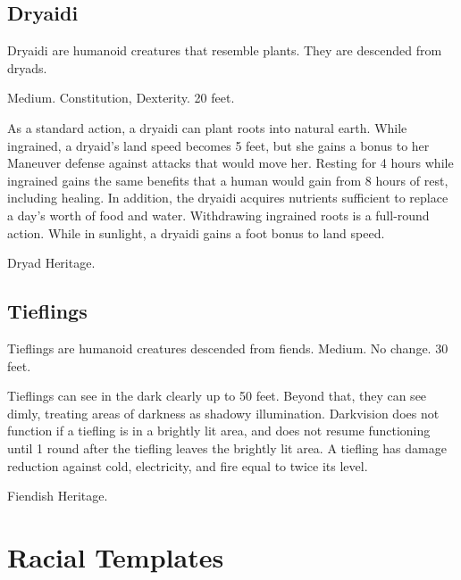     \subsection{Dryaidi}

        Dryaidi are humanoid creatures that resemble plants. They are descended from dryads.

         Medium.
          Constitution,  Dexterity.
         20 feet.
        \begin{itemize}
             As a standard action, a dryaidi can plant roots into natural earth. While ingrained, a dryaid's land speed becomes 5 feet, but she gains a  bonus to her Maneuver defense against attacks that would move her. Resting for 4 hours while ingrained gains the same benefits that a human would gain from 8 hours of rest, including healing. In addition, the dryaidi acquires nutrients sufficient to replace a day's worth of food and water. Withdrawing ingrained roots is a full-round action.
             While in sunlight, a dryaidi gains a  foot bonus to land speed.
        \end{itemize}
         Dryad Heritage.

    \subsection{Tieflings}

        Tieflings are humanoid creatures descended from fiends.
         Medium.
         No change.
         30 feet.
        \begin{itemize}
             Tieflings can see in the dark clearly up to 50 feet. Beyond that, they can see dimly, treating areas of darkness as shadowy illumination. Darkvision does not function if a tiefling is in a brightly lit area, and does not resume functioning until 1 round after the tiefling leaves the brightly lit area.
             A tiefling has damage reduction against cold, electricity, and fire equal to twice its level.
        \end{itemize}
         Fiendish Heritage.

\section{Racial Templates}

